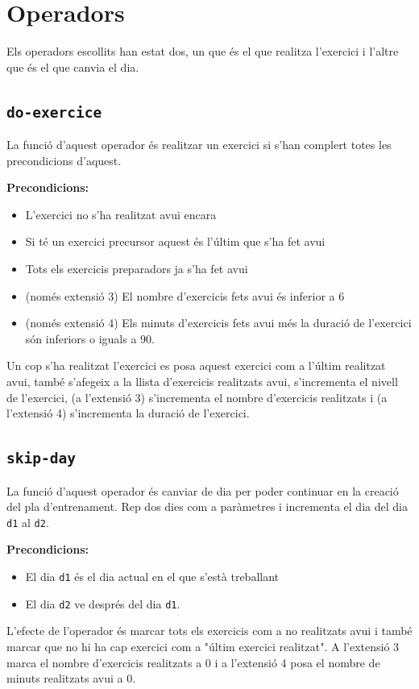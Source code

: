 \documentclass[a4paper,12pt, UTF-8]{article}
\begin{document}
\section{Operadors}

Els operadors escollits han estat dos, un que és el que realitza l'exercici i l'altre que és el que canvia el dia.

\subsection{\texttt{do-exercice}}

La funció d'aquest operador és realitzar un exercici si s'han complert totes les precondicions d'aquest.

\textbf{Precondicions: } 
\begin{itemize}
	\item L'exercici no s'ha realitzat avui encara
	\item Si té un exercici precursor aquest és l'últim que s'ha fet avui
	\item Tots els exercicis preparadors ja s'ha fet avui
	\item (només extensió 3) El nombre d'exercicis fets avui és inferior a 6
	\item (només extensió 4) Els minuts d'exercicis fets avui més la duració de l'exercici són inferiors o iguals a 90.
\end{itemize}

Un cop s'ha realitzat l'exercici es posa aquest exercici com a l'últim realitzat avui, també s'afegeix a la llista d'exercicis realitzats avui, s'incrementa el nivell de l'exercici, (a l'extensió 3) s'incrementa el nombre d'exercicis realitzats i (a l'extensió 4) s'incrementa la duració de l'exercici.

\subsection{\texttt{skip-day}}

La funció d'aquest operador és canviar de dia per poder continuar en la creació del pla d'entrenament. Rep dos dies com a paràmetres i incrementa el dia del dia \verb|d1| al \verb|d2|.

\textbf{Precondicions: }
\begin{itemize}
	\item El dia \verb|d1| és el dia actual en el que s'està treballant
	\item El dia \verb|d2| ve després del dia \verb|d1|.
\end{itemize}

L'efecte de l'operador és marcar tots els exercicis com a no realitzats avui i també marcar que no hi ha cap exercici com a "últim exercici realitzat". A l'extensió 3 marca el nombre d'exercicis realitzats a 0 i a l'extensió 4 posa el nombre de minuts realitzats avui a 0.
\end{document}

